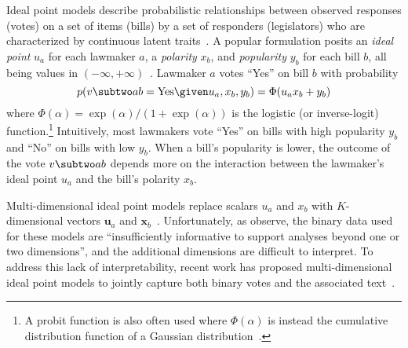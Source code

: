 Ideal point models describe probabilistic
relationships between observed responses (votes) on a set of items (bills) by a set of
responders (legislators) who are characterized by continuous latent
traits~\cite{Fox:Book10}.  A popular formulation posits an
\textit{ideal point} $u_a$ for each lawmaker $a$, a \textit{polarity}
$x_b$, and \textit{popularity} $y_b$ for each bill $b$, all being
values in
$(-\infty,+\infty)$~\cite{Martin:PA02,Bafumi:PA05,Gerrish:ICML11}. Lawmaker
$a$ votes ``Yes'' on bill $b$ with probability
\begin{equation}
  p(v \subtwo ab = \mbox{Yes} \given u_a, x_b, y_b) = \Phi(u_a x_b + y_b)
  \label{eqn:c6_onedim}
\end{equation}
where $\Phi(\alpha) = \exp(\alpha) / (1 + \exp(\alpha))$ is the
logistic (or inverse-logit) function.\footnote{A probit function is
  also often used where $\Phi(\alpha)$ is instead the cumulative
  distribution function of a Gaussian
  distribution~\cite{Martin:PA02}.} Intuitively, most lawmakers
vote ``Yes'' on bills with high popularity $y_b$ and ``No'' on bills
with low $y_b$. When a bill's popularity is lower, the outcome of
the vote $v \subtwo ab$ depends more on the interaction between the lawmaker's ideal
point $u_a$ and the bill's polarity $x_b$.

Multi-dimensional ideal point models replace scalars $u_a$ and $x_b$
with $K$-dimensional vectors $\bm u_a$ and $\bm
x_b$~\cite{Heckman:NBER96,Jackman:PA01,Clinton:APSR04}.
Unfortunately, as  observe, the binary data
used for these models are ``insufficiently informative to support
analyses beyond one or two dimensions'', and the additional dimensions
are difficult to interpret.  To address this lack of interpretability, recent work has proposed multi-dimensional ideal point models to jointly capture both binary votes and the associated text~\cite{Gerrish:NIPS12,Gu:KDD14,Lauderdale:AJPS14,Sim:AAAI15:utility}.


